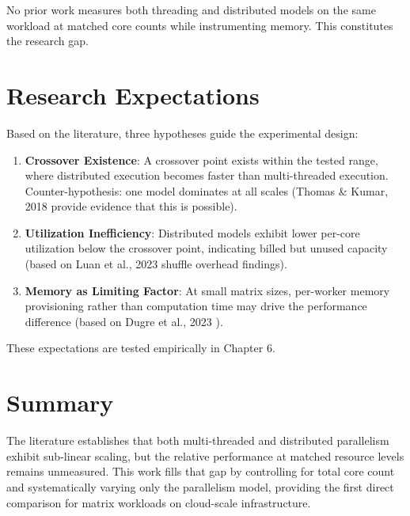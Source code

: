 No prior work measures both threading and distributed models on the same workload at matched core counts while instrumenting memory. This constitutes the research gap.

\section{Research Expectations}

Based on the literature, three hypotheses guide the experimental design:

\begin{enumerate}
    \item \textbf{Crossover Existence}: A crossover point exists within the tested range, where distributed execution becomes faster than multi-threaded execution. Counter-hypothesis: one model dominates at all scales (Thomas \& Kumar, 2018 \cite{thomas2018comparative} provide evidence that this is possible).
    
    \item \textbf{Utilization Inefficiency}: Distributed models exhibit lower per-core utilization below the crossover point, indicating billed but unused capacity (based on Luan et al., 2023 \cite{luan2023exoshuffle} shuffle overhead findings).
    
    \item \textbf{Memory as Limiting Factor}: At small matrix sizes, per-worker memory provisioning rather than computation time may drive the performance difference (based on Dugre et al., 2023 \cite{dugre2023performance}).
\end{enumerate}

These expectations are tested empirically in Chapter 6.

\section{Summary}

The literature establishes that both multi-threaded and distributed parallelism exhibit sub-linear scaling, but the relative performance at matched resource levels remains unmeasured. This work fills that gap by controlling for total core count and systematically varying only the parallelism model, providing the first direct comparison for matrix workloads on cloud-scale infrastructure.
